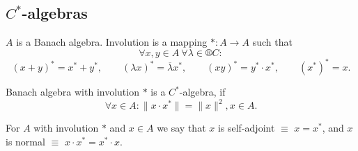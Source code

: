 \documentclass[12pt]{article}					%
\begin{document}
\subsection{$C^*$-algebras}
\begin{definice}[Involution]
	$A$ is a Banach algebra. Involution is a mapping $*: A \rightarrow A$ such that
	$$ \forall x, y \in A\ \forall λ \in ®C: $$
	$$ (x + y)^* = x^* + y^*, \qquad (λx)^* = \overline{λ} x^*, \qquad (xy)^* = y^*·x^*, \qquad (x^*)^* = x. $$
\end{definice}

\begin{definice}[$C^*$-algebra]
	Banach algebra with involution $*$ is a $C^*$-algebra, if
	$$ \forall x \in A: \|x·x^*\| = \|x\|^2, x \in A. $$
\end{definice}

\begin{definice}
	For $A$ with involution $*$ and $x \in A$ we say that $x$ is self-adjoint $≡$ $x = x^*$, and $x$ is normal $≡$ $x·x^* = x^*·x$.
\end{definice}
\end{document}
